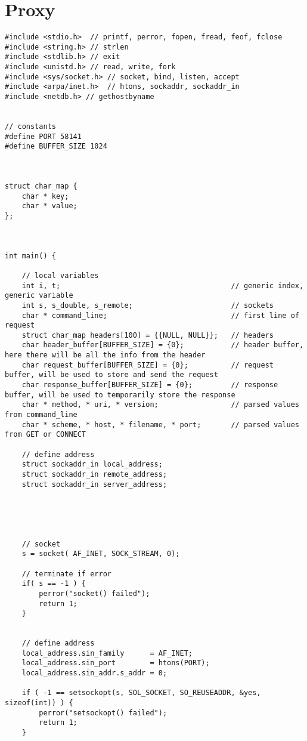 \section{Proxy}

\begin{lstlisting}
#include <stdio.h>  // printf, perror, fopen, fread, feof, fclose
#include <string.h> // strlen
#include <stdlib.h> // exit
#include <unistd.h> // read, write, fork
#include <sys/socket.h> // socket, bind, listen, accept
#include <arpa/inet.h>  // htons, sockaddr, sockaddr_in
#include <netdb.h> // gethostbyname


// constants
#define PORT 58141
#define BUFFER_SIZE 1024



struct char_map {
    char * key;
    char * value;
};



int main() {

    // local variables
    int i, t;                                        // generic index, generic variable
    int s, s_double, s_remote;                       // sockets
    char * command_line;                             // first line of request
    struct char_map headers[100] = {{NULL, NULL}};   // headers
    char header_buffer[BUFFER_SIZE] = {0};           // header buffer, here there will be all the info from the header
    char request_buffer[BUFFER_SIZE] = {0};          // request buffer, will be used to store and send the request
    char response_buffer[BUFFER_SIZE] = {0};         // response buffer, will be used to temporarily store the response
    char * method, * uri, * version;                 // parsed values from command_line
    char * scheme, * host, * filename, * port;       // parsed values from GET or CONNECT

    // define address
    struct sockaddr_in local_address;
    struct sockaddr_in remote_address;
    struct sockaddr_in server_address;





    // socket
    s = socket( AF_INET, SOCK_STREAM, 0);

    // terminate if error
    if( s == -1 ) {
        perror("socket() failed");
        return 1;
    }

    
    // define address
    local_address.sin_family      = AF_INET;
    local_address.sin_port        = htons(PORT);
    local_address.sin_addr.s_addr = 0;

    if ( -1 == setsockopt(s, SOL_SOCKET, SO_REUSEADDR, &yes, sizeof(int)) ) {
        perror("setsockopt() failed");
        return 1;
    }


\end{lstlisting}
